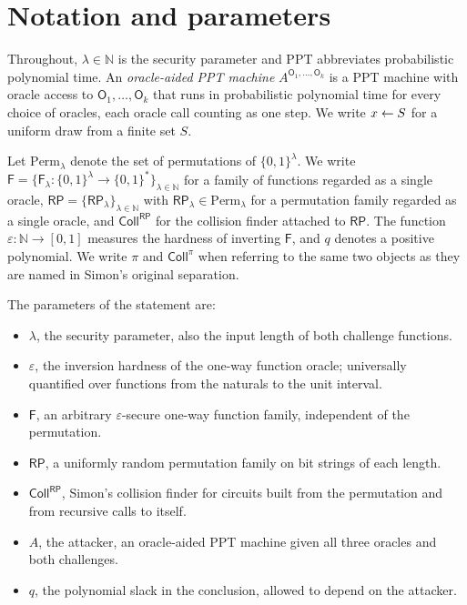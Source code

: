 \documentclass{aicr-conjecture}
\newcommand{\Fs}{\mathsf{F}}          %
\newcommand{\RP}{\mathsf{RP}}         %
\newcommand{\Coll}{\mathsf{Coll}}     %
\newcommand{\Oc}{\mathsf{O}}
\newcommand{\bits}{\{0,1\}}
\newcommand{\Perm}{\mathrm{Perm}}
\begin{document}
\section{Notation and parameters}\label{sec:notation}

Throughout, $\lambda\in\mathbb{N}$ is the security parameter and PPT
abbreviates probabilistic polynomial time. An \emph{oracle-aided PPT
machine} $A^{\Oc_1,\dots,\Oc_k}$ is a PPT machine with oracle access to
$\Oc_1,\dots,\Oc_k$ that runs in probabilistic polynomial time for every
choice of oracles, each oracle call counting as one step. We write
$x\leftarrow S$ for a uniform draw from a finite set $S$.

Let $\Perm_\lambda$ denote the set of permutations of $\bits^{\lambda}$.
We write
$\Fs=\{\Fs_\lambda\colon\bits^{\lambda}\to\bits^{*}\}_{
\lambda\in\mathbb{N}}$ for a family of functions regarded as a single
oracle, $\RP=\{\RP_\lambda\}_{\lambda\in\mathbb{N}}$ with
$\RP_\lambda\in\Perm_\lambda$ for a permutation family regarded as a
single oracle, and $\Coll^{\RP}$ for the collision finder attached to
$\RP$. The function $\varepsilon\colon\mathbb{N}\to[0,1]$ measures the
hardness of inverting $\Fs$, and $q$ denotes a positive polynomial. We
write $\pi$ and $\Coll^{\pi}$ when referring to the same two objects as
they are named in Simon's original separation.

The parameters of the statement are:
\begin{itemize}
\item $\lambda$, the security parameter, also the input length of both
  challenge functions.
\item $\varepsilon$, the inversion hardness of the one-way function
  oracle; universally quantified over functions from the naturals to the
  unit interval.
\item $\Fs$, an arbitrary $\varepsilon$-secure one-way function family,
  independent of the permutation.
\item $\RP$, a uniformly random permutation family on bit strings of
  each length.
\item $\Coll^{\RP}$, Simon's collision finder for circuits built from
  the permutation and from recursive calls to itself.
\item $A$, the attacker, an oracle-aided PPT machine given all three
  oracles and both challenges.
\item $q$, the polynomial slack in the conclusion, allowed to depend on
  the attacker.
\end{itemize}
\end{document}
